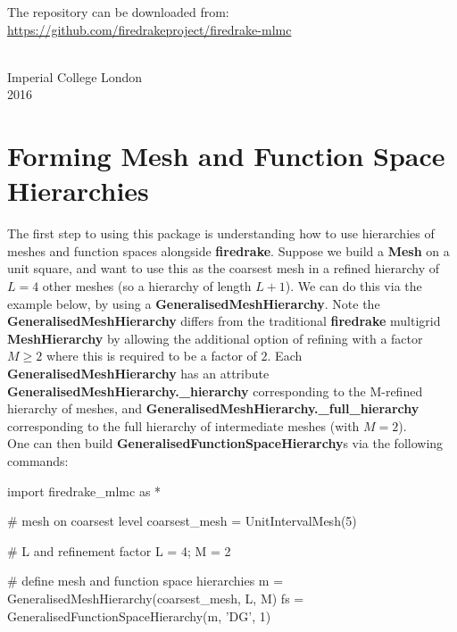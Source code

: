 \documentclass[10pt,letterpaper,extrafontsizes]{memoir}
\newcommand\svnidlong[4]{}
\newcommand\pythonclass[1]{\textbf{\color{deepred}#1}}
\begin{document}
    The repository can be downloaded from: \\
    \url{https://github.com/firedrakeproject/firedrake-mlmc}
    
{ \\ Imperial College London \\ 2016\par}


\svnidlong
{$Ignore: $}
{$LastChangedDate: 2015-04-22 17:17:51 +0200 (Wed, 22 Apr 2015) $}
{$LastChangedRevision: 527 $}
{$LastChangedBy: daleif $}

\chapter{Forming Mesh and Function Space Hierarchies}

The first step to using this package is understanding how to use hierarchies of meshes and function spaces alongside \textbf{firedrake}. Suppose we build a \pythonclass{Mesh} on a unit square, and want to use this as the coarsest mesh in a refined hierarchy of $L = 4$ other meshes (so a hierarchy of length $L + 1$). We can do this via the example below, by using a \pythonclass{GeneralisedMeshHierarchy}. Note the \pythonclass{GeneralisedMeshHierarchy} differs from the traditional \textbf{firedrake} multigrid \pythonclass{MeshHierarchy} by allowing the additional option of refining with a factor $M \geq 2$ where this is required to be a factor of $2$. Each \pythonclass{GeneralisedMeshHierarchy} has an attribute \pythonclass{GeneralisedMeshHierarchy.\_hierarchy} corresponding to the M-refined hierarchy of meshes, and \pythonclass{GeneralisedMeshHierarchy.\_full\_hierarchy} corresponding to the full hierarchy of intermediate meshes (with $M = 2$). \\
One can then build \pythonclass{GeneralisedFunctionSpaceHierarchy}s via the following commands:\\

\begin{python}
import firedrake_mlmc as *

# mesh on coarsest level
coarsest_mesh = UnitIntervalMesh(5)

# L and refinement factor
L = 4; M = 2

# define mesh and function space hierarchies 
m = GeneralisedMeshHierarchy(coarsest_mesh, L, M)
fs = GeneralisedFunctionSpaceHierarchy(m, 'DG', 1)
\end{python}
\end{document}
